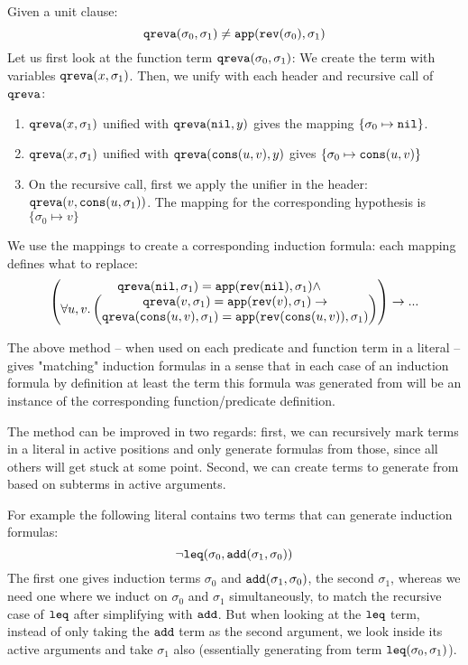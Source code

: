 \begin{example}\label{ex:3}
	Given a unit clause:
	$$\mathtt{qreva}(\sigma_0,\sigma_1)\neq\mathtt{app}(\mathtt{rev}(\sigma_0),\sigma_1)$$
	Let us first look at the function term $\mathtt{qreva}(\sigma_0,\sigma_1)$:
	We create the term with variables $\mathtt{qreva}(x,\sigma_1)$. Then, we unify with each
	header and recursive call of $\mathtt{qreva}$:
	\begin{enumerate}
		\item $\mathtt{qreva}(x,\sigma_1)$ unified with $\mathtt{qreva}(\mathtt{nil},y)$ gives the mapping $\{\sigma_0\mapsto\mathtt{nil}\}$.
		\item $\mathtt{qreva}(x,\sigma_1)$ unified with $\mathtt{qreva}(\mathtt{cons}(u,v),y)$ gives $\{\sigma_0\mapsto\mathtt{cons}(u,v)\}$
		\item On the recursive call, first we apply the unifier in the header: $\mathtt{qreva}(v, \mathtt{cons}(u,\sigma_1))$. The mapping for the corresponding hypothesis is $\{\sigma_0\mapsto v\}$
	\end{enumerate}
	We use the mappings to create a corresponding induction formula: each mapping defines what to replace:
	$$\begin{pmatrix}
	\mathtt{qreva}(\mathtt{nil},\sigma_1)=\mathtt{app}(\mathtt{rev}(\mathtt{nil}),\sigma_1)\land\\
	\forall u,v.\begin{pmatrix}\mathtt{qreva}(v,\sigma_1)=\mathtt{app}(\mathtt{rev}(v),\sigma_1)\rightarrow\\
	\mathtt{qreva}(\mathtt{cons}(u,v),\sigma_1)=\mathtt{app}(\mathtt{rev}(\mathtt{cons}(u,v)),\sigma_1)\end{pmatrix}
	\end{pmatrix}\rightarrow...$$
\end{example}

The above method -- when used on each predicate and function term in a literal -- gives "matching" induction formulas in a sense that in each case of an induction formula by definition at least the term this formula was generated from will be an instance of the corresponding function/predicate definition.

The method can be improved in two regards: first, we can recursively mark terms in a literal in active positions and only generate formulas from those, since all others will get stuck at some point. Second, we can create terms to generate from based on subterms in active arguments.

For example the following literal contains two terms that can generate induction formulas:
$$\neg\mathtt{leq}(\sigma_0,\mathtt{add}(\sigma_1,\sigma_0))$$
The first one gives induction terms $\sigma_0$ and $\mathtt{add}(\sigma_1,\sigma_0)$, the second $\sigma_1$, whereas we need one where we induct on $\sigma_0$ and $\sigma_1$ simultaneously, to match the recursive case of $\mathtt{leq}$ after simplifying with $\mathtt{add}$. But when looking at the $\mathtt{leq}$ term, instead of only taking the $\mathtt{add}$ term as the second argument, we look inside its active arguments and take $\sigma_1$ also (essentially generating from term $\mathtt{leq}(\sigma_0, \sigma_1)$).

